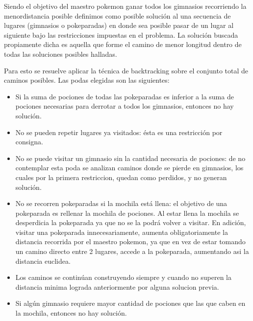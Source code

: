Siendo el objetivo del maestro pokemon ganar todos los gimnasios recorriendo la menordistancia posible definimos como posible solución al una secuencia de lugares (gimnasios o pokeparadas) en donde sea posible pasar de un lugar al siguiente bajo las restricciones impuestas en el problema. La solución buscada propiamente dicha es aquella que forme el camino de menor longitud dentro de todas las soluciones posibles halladas.

Para esto se resuelve aplicar la técnica de backtracking sobre el conjunto total de caminos posibles. Las podas elegidas son las siguientes:

\begin{itemize}
\item Si la suma de pociones de todas las pokeparadas es inferior a la suma de pociones necesarias para derrotar a todos los gimnasios, entonces no hay solución.
\item No se pueden repetir lugares ya visitados: ésta es una restricción por consigna.
\item No se puede visitar un gimnasio sin la cantidad necesaria de pociones: de no contemplar esta poda se analizan caminos donde se pierde en gimnasios, los cuales por la primera restriccion, quedan como perdidos, y no generan solución.
\item No se recorren pokeparadas si la mochila está llena: el objetivo de una pokeparada es rellenar la mochila de pociones. Al estar llena la mochila se desperdicia la pokeparada ya que no se la podrá volver a visitar. En adición, visitar una pokeparada innecesariamente, aumenta obligatoriamente la distancia recorrida por el maestro pokemon, ya que en vez de estar tomando un camino directo entre 2 lugares, accede a la pokeparada, aumentando asi la distancia euclidea.
\item Los caminos se continúan construyendo siempre y cuando no superen la distancia minima lograda anteriormente por alguna solucion previa.
\item Si algún gimnasio requiere mayor cantidad de pociones que las que caben en la mochila, entonces no hay solución. 

\end{itemize}